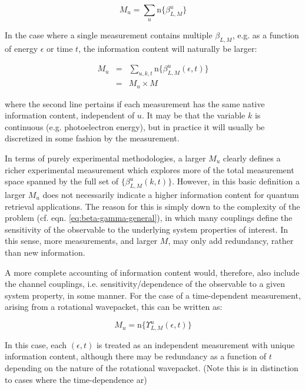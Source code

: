 \begin{equation}
M_{u}=\sum_{u}\mathrm{n}\{\beta_{L,M}^{u}\}
\end{equation}

In the case where a single measurement contains multiple $\beta_{L,M}$, e.g. as a function of energy $\epsilon$ or time $t$, the information content will naturally be larger:

\begin{eqnarray}
M_{u} & = & \sum_{u,k,t}\mathrm{n}\{\beta_{L,M}^{u}(\epsilon,t)\}\\
 & = & M_{u}\times M
\end{eqnarray}

where the second line pertains if each measurement has the same native
information content, independent of $u$. It may be that the variable
$k$ is continuous (e.g. photoelectron energy), but in practice it
will usually be discretized in some fashion by the measurement.

In terms of purely experimental methodologies, a larger $M_{u}$ clearly defines a richer experimental measurement which explores more of the total measurement space spanned by the full set of $\{\beta_{L,M}^{u}(k,t)\}$. However, in this basic definition a larger $M_{u}$ does not necessarily indicate a higher information content for quantum retrieval applications.
The reason for this is simply down to the complexity of the problem
(cf. eqn. \ref{eq:beta-gamma-general}), in which many couplings define
the sensitivity of the observable to the underlying system properties
of interest. In this sense, more measurements, and larger $M$, may
only add redundancy, rather than new information.

A more complete accounting of information content would, therefore,
also include the channel couplings, i.e. sensitivity/dependence of the observable to a given system property, in some manner. For the case of a time-dependent measurement, arising from a rotational wavepacket, this can be written as:

\begin{equation}
M_{u}=\mathrm{n}\{\varUpsilon_{L,M}^{u}(\epsilon,t)\}
\end{equation}

In this case, each $(\epsilon,t)$ is treated as an independent measurement with unique information content, although there may be redundancy as a function of $t$ depending on the nature of the rotational wavepacket. (Note this is in distinction to cases where the time-dependence ar)




